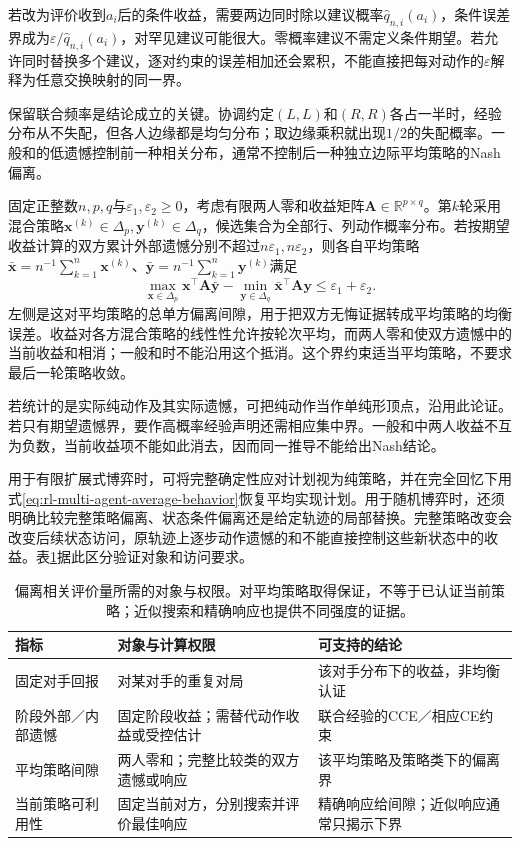 若改为评价收到$a_i$后的条件收益，需要两边同时除以建议概率$\hat q_{n,i}(a_i)$，条件误差界成为$\varepsilon/\hat q_{n,i}(a_i)$，对罕见建议可能很大。零概率建议不需定义条件期望。若允许同时替换多个建议，逐对约束的误差相加还会累积，不能直接把每对动作的$\varepsilon$解释为任意交换映射的同一界。

保留联合频率是结论成立的关键。协调约定$(L,L)$和$(R,R)$各占一半时，经验分布从不失配，但各人边缘都是均匀分布；取边缘乘积就出现$1/2$的失配概率。一般和的低遗憾控制前一种相关分布，通常不控制后一种独立边际平均策略的Nash偏离。

固定正整数$n,p,q$与$\varepsilon_1,\varepsilon_2\geq0$，考虑有限两人零和收益矩阵$\bm A\in\mathbb R^{p\times q}$。第$k$轮采用混合策略$\bm x^{(k)}\in\Delta_p,\bm y^{(k)}\in\Delta_q$，候选集合为全部行、列动作概率分布。若按期望收益计算的双方累计外部遗憾分别不超过$n\varepsilon_1,n\varepsilon_2$，则各自平均策略
$\bar{\bm x}=n^{-1}\sum_{k=1}^n\bm x^{(k)}$、$\bar{\bm y}=n^{-1}\sum_{k=1}^n\bm y^{(k)}$满足
\[
 \max_{\bm x\in\Delta_p}\bm x^\top\bm A\bar{\bm y}
 -\min_{\bm y\in\Delta_q}\bar{\bm x}^\top\bm A\bm y
 \leq\varepsilon_1+\varepsilon_2.
\]
左侧是这对平均策略的总单方偏离间隙，用于把双方无悔证据转成平均策略的均衡误差。收益对各方混合策略的线性性允许按轮次平均，而两人零和使双方遗憾中的当前收益和相消；一般和时不能沿用这个抵消。这个界约束适当平均策略，不要求最后一轮策略收敛。

若统计的是实际纯动作及其实际遗憾，可把纯动作当作单纯形顶点，沿用此论证。若只有期望遗憾界，要作高概率经验声明还需相应集中界。一般和中两人收益不互为负数，当前收益项不能如此消去，因而同一推导不能给出Nash结论。

用于有限扩展式博弈时，可将完整确定性应对计划视为纯策略，并在完全回忆下用式\eqref{eq:rl-multi-agent-average-behavior}恢复平均实现计划。用于随机博弈时，还须明确比较完整策略偏离、状态条件偏离还是给定轨迹的局部替换。完整策略改变会改变后续状态访问，原轨迹上逐步动作遗憾的和不能直接控制这些新状态中的收益。表\ref{tab:rl-multi-agent-guarantees}据此区分验证对象和访问要求。

\begin{table}[htbp]
 \centering
 \begin{tabularx}{\linewidth}{@{}l >{\raggedright\arraybackslash}X >{\raggedright\arraybackslash}X@{}}
 \toprule
 指标 & 对象与计算权限 & 可支持的结论\\
 \midrule
 固定对手回报 & 对某对手的重复对局 & 该对手分布下的收益，非均衡认证\\
 阶段外部／内部遗憾 & 固定阶段收益；需替代动作收益或受控估计 & 联合经验的CCE／相应CE约束\\
 平均策略间隙 & 两人零和；完整比较类的双方遗憾或响应 & 该平均策略及策略类下的偏离界\\
 当前策略可利用性 & 固定当前对方，分别搜索并评价最佳响应 & 精确响应给间隙；近似响应通常只揭示下界\\
 \bottomrule
 \end{tabularx}
 \caption{偏离相关评价量所需的对象与权限。对平均策略取得保证，不等于已认证当前策略；近似搜索和精确响应也提供不同强度的证据。}
 \label{tab:rl-multi-agent-guarantees}
\end{table}

